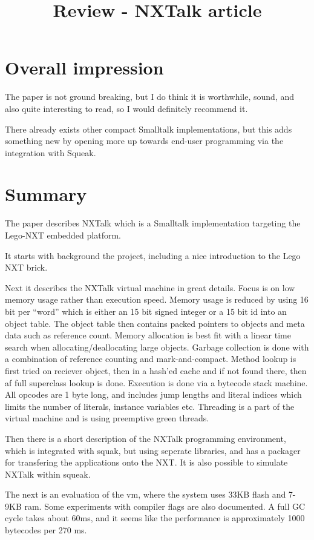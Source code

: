 \documentclass{article}
\title{Review - NXTalk article}
\begin{document}
\maketitle

\section*{Overall impression}
The paper is not ground breaking, but I do think it is
worthwhile, sound, and also quite interesting
to read, so I would definitely recommend it.

There already exists other compact Smalltalk implementations,
but this adds something new by opening more up towards
end-user programming via the integration with Squeak.

\section*{Summary}
The paper describes NXTalk which is a Smalltalk implementation targeting the Lego-NXT embedded platform.

It starts with background the project, including a nice introduction to the Lego NXT brick.

Next it describes the NXTalk virtual machine in great details.
Focus is on low memory usage rather than execution speed.
Memory usage is reduced by using 16 bit per ``word'' which is either an 15 bit signed integer or a 15 bit id into an object table. 
The object table then contains packed pointers to objects and meta data such as reference count.
Memory allocation is best fit with a linear time search when allocating/deallocating large objects.
Garbage collection is done with a combination of reference counting and mark-and-compact.
Method lookup is first tried on reciever object, then in a hash'ed cache and if not found there, then af full superclass lookup is done.
Execution is done via a bytecode stack machine. 
All opcodes are 1 byte long, and includes jump lengths and literal indices which limits the number of literals, instance variables etc. 
Threading is a part of the virtual machine and is using preemptive green threads.

Then there is a short description of the NXTalk programming environment, which is integrated with squak, but using seperate libraries, and has a packager for transfering the applications onto the NXT.
It is also possible to simulate NXTalk within squeak.

The next is an evaluation of the vm, where the system uses 33KB flash and 7-9KB ram. Some experiments with compiler flags are also documented. A full GC cycle takes about 60ms, and it seems like the performance is approximately 1000 bytecodes per 270 ms.
\end{document}
